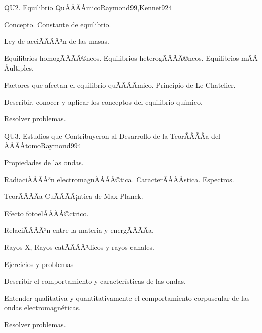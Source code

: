 \begin{sumilla}
\begin{unit}{QU2. Equilibrio QuÃÂÃÂ­mico}{Raymond99,Kennet92}{4}
\begin{topicos}
      \item Concepto. Constante de equilibrio.
      \item Ley de acciÃÂÃÂ³n de las masas.
      \item Equilibrios homogÃÂÃÂ©neos. Equilibrios heterogÃÂÃÂ©neos. Equilibrios m\ÃÂÃÂultiples.
      \item Factores que afectan el equilibrio quÃÂÃÂ­mico. Principio de Le Chatelier.
    \end{topicos}
   \begin{objetivos}
      \item Describir, conocer y aplicar los conceptos del equilibrio qu\'imico.
      \item Resolver problemas.
   \end{objetivos}
\end{unit}

\begin{unit}{QU3. Estudios que Contribuyeron al Desarrollo de la TeorÃÂÃÂ­a del ÃÂÃÂtomo}{Raymond99}{4}
\begin{topicos}
      \item Propiedades de las ondas.
      \item RadiaciÃÂÃÂ³n electromagnÃÂÃÂ©tica. CaracterÃÂÃÂ­stica. Espectros.
      \item TeorÃÂÃÂ­a CuÃÂÃÂ¡ntica de Max Planck.
      \item Efecto fotoelÃÂÃÂ©ctrico.
      \item RelaciÃÂÃÂ³n entre la materia y energÃÂÃÂ­a.
      \item Rayos X, Rayos catÃÂÃÂ³dicos y rayos canales.
      \item Ejercicios y problemas
\end{topicos}

   \begin{objetivos}
      \item Describir el comportamiento y caracter\'isticas de las ondas.
      \item Entender qualitativa y quantitativamente el comportamiento corpuscular de las ondas electromagn\'eticas.
      \item Resolver problemas.
   \end{objetivos}
\end{unit}


\end{sumilla}
